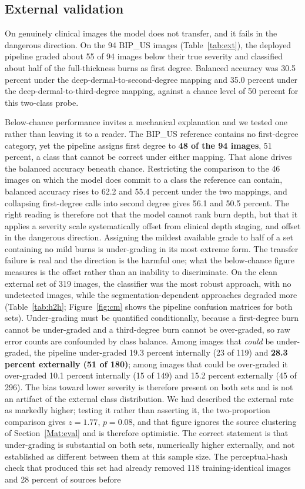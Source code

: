 \documentclass{melba}
\begin{document}
\subsection{External validation}
\label{Res:ext}
On genuinely clinical images the model does not transfer, and it fails in the dangerous direction. On the 94 BIP\_US images (Table~\ref{tab:ext}), the deployed pipeline graded about 55 of 94 images below their true severity and classified about half of the full-thickness burns as first degree. Balanced accuracy was 30.5 percent under the deep-dermal-to-second-degree mapping and 35.0 percent under the deep-dermal-to-third-degree mapping, against a chance level of 50 percent for this two-class probe.

Below-chance performance invites a mechanical explanation and we tested one rather than leaving it to a reader. The BIP\_US reference contains no first-degree category, yet the pipeline assigns first degree to \textbf{48 of the 94 images}, 51 percent, a class that cannot be correct under either mapping. That alone drives the balanced accuracy beneath chance. Restricting the comparison to the 46 images on which the model does commit to a class the reference can contain, balanced accuracy rises to 62.2 and 55.4 percent under the two mappings, and collapsing first-degree calls into second degree gives 56.1 and 50.5 percent. The right reading is therefore not that the model cannot rank burn depth, but that it applies a severity scale systematically offset from clinical depth staging, and offset in the dangerous direction. Assigning the mildest available grade to half of a set containing no mild burns is under-grading in its most extreme form. The transfer failure is real and the direction is the harmful one; what the below-chance figure measures is the offset rather than an inability to discriminate. On the clean external set of 319 images, the classifier was the most robust approach, with no undetected images, while the segmentation-dependent approaches degraded more (Table~\ref{tab:h2h}; Figure~\ref{fig:cm} shows the pipeline confusion matrices for both sets). Under-grading must be quantified conditionally, because a first-degree burn cannot be under-graded and a third-degree burn cannot be over-graded, so raw error counts are confounded by class balance. Among images that \emph{could} be under-graded, the pipeline under-graded 19.3 percent internally (23 of 119) and \textbf{28.3 percent externally (51 of 180)}; among images that could be over-graded it over-graded 10.1 percent internally (15 of 149) and 15.2 percent externally (45 of 296). The bias toward lower severity is therefore present on both sets and is not an artifact of the external class distribution. We had described the external rate as markedly higher; testing it rather than asserting it, the two-proportion comparison gives $z=1.77$, $p=0.08$, and that figure ignores the source clustering of Section~\ref{Mat:eval} and is therefore optimistic. The correct statement is that under-grading is substantial on both sets, numerically higher externally, and not established as different between them at this sample size. The perceptual-hash check that produced this set had already removed 118 training-identical images and 28 percent of sources before 
\end{document}
